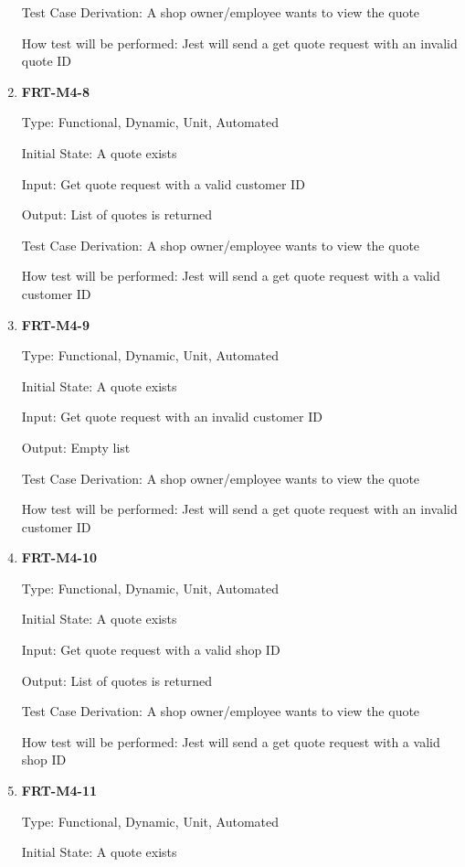 \documentclass[12pt, titlepage]{article}
\begin{document}
\begin{enumerate}
	      Test Case Derivation: A shop owner/employee wants to view the quote

	      How test will be performed: Jest will send a get quote request with an invalid quote ID

	\item \textbf{FRT-M4-8}

	      Type: Functional, Dynamic, Unit, Automated

	      Initial State: A quote exists

	      Input: Get quote request with a valid customer ID

	      Output: List of quotes is returned

	      Test Case Derivation: A shop owner/employee wants to view the quote

	      How test will be performed: Jest will send a get quote request with a valid customer ID

	\item \textbf{FRT-M4-9}

	      Type: Functional, Dynamic, Unit, Automated

	      Initial State: A quote exists

	      Input: Get quote request with an invalid customer ID

	      Output: Empty list

	      Test Case Derivation: A shop owner/employee wants to view the quote

	      How test will be performed: Jest will send a get quote request with an invalid customer ID

	\item \textbf{FRT-M4-10}

	      Type: Functional, Dynamic, Unit, Automated

	      Initial State: A quote exists

	      Input: Get quote request with a valid shop ID

	      Output: List of quotes is returned

	      Test Case Derivation: A shop owner/employee wants to view the quote

	      How test will be performed: Jest will send a get quote request with a valid shop ID

	\item \textbf{FRT-M4-11}

	      Type: Functional, Dynamic, Unit, Automated

	      Initial State: A quote exists


\end{enumerate}
\end{document}
